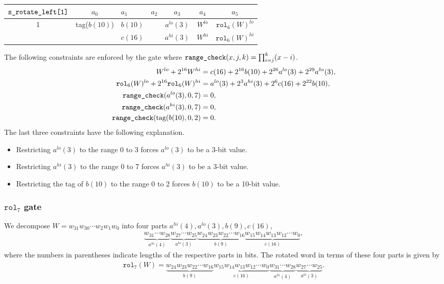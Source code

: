 \documentclass[10pt]{article}
\begin{document}
\begin{center}
  \begin{tabular}{c|c|l|l|c|c|c}
    $\texttt{s\textunderscore rotate\textunderscore left[1]}$ & $a_0$ & $a_1$ & $a_2$ & $a_3$ & $a_4$ & $a_5$ \\ \hline
    1  & tag($b(10)$) & $b(10)$ &                        & $a^{lo}(3)$ & $W^{lo}$  & $\texttt{rol}_6(W)^{lo}$  \\ 
       &              & $c(16)$ &                        & $a^{hi}(3)$ & $W^{hi}$  & $\texttt{rol}_6(W)^{hi}$  \\ \hline
  \end{tabular}
\end{center}

The following constraints are enforced by the gate where $\texttt{range\textunderscore check}(x, j, k) = \prod_{i=j}^k (x-i)$.
\begin{align*}
  W^{lo} + 2^{16} W^{hi} & = c(16) + 2^{16} b(10) + 2^{26} a^{lo}(3) + 2^{29} a^{hi}(3),\\
  \texttt{rol}_6(W)^{lo} + 2^{16} \texttt{rol}_6(W)^{hi} & = a^{lo}(3) + 2^{3} a^{hi}(3) + 2^6 c(16) + 2^{22} b(10),\\
  \texttt{range\textunderscore check}(a^{lo}(3), 0, 7) & = 0,\\
  \texttt{range\textunderscore check}(a^{hi}(3), 0, 7) & = 0,\\
  \texttt{range\textunderscore check}(\text{tag}(b(10), 0, 2) & = 0.
\end{align*}
The last three constraints have the following explanation.
\begin{itemize}
\item Restricting $a^{lo}(3)$ to the range 0 to 3 forces $a^{lo}(3)$ to be a 3-bit value.
\item Restricting $a^{hi}(3)$ to the range 0 to 7 forces $a^{hi}(3)$ to be a 3-bit value.
\item Restricting the tag of $b(10)$ to the range 0 to 2 forces $b(10)$ to be a 10-bit value.
\end{itemize}


\subsubsection{$\texttt{rol}_7$ gate}%
\label{sec:rol_7_gate}
We decompose $W = w_{31}w_{30}\cdots w_2w_1w_0$ into four parts $a^{hi}(4), a^{lo}(3), b(9), c(16)$,
\begin{align*}
  \underbrace{w_{31}\cdots w_{28}}_{a^{hi}(4)} \underbrace{w_{27}\cdots w_{25}}_{a^{lo}(3)}
  \underbrace{w_{24}w_{23}w_{22}\cdots w_{16}}_{b(9)} \underbrace{w_{15}w_{14}w_{13}w_{12}\cdots w_{0}}_{c(16)},
\end{align*}
where the numbers in parentheses indicate lengths of the respective parts in bits. The rotated word in terms of these four parts is given by
\begin{align*}
  \texttt{rol}_7(W) = 
  \underbrace{w_{24}w_{23}w_{22}\cdots w_{16}}_{b(9)} \underbrace{w_{15}w_{14}w_{13}w_{12}\cdots w_{0}}_{c(16)}
\underbrace{w_{31}\cdots w_{28}}_{a^{hi}(4)} \underbrace{w_{27}\cdots w_{25}}_{a^{lo}(3)}.
\end{align*}
\end{document}
